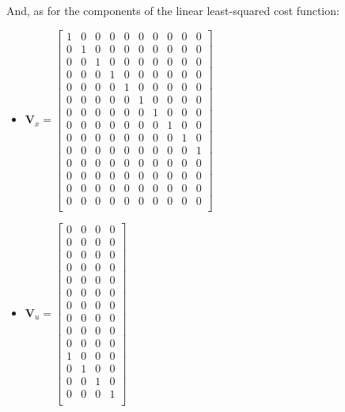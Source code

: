 \documentclass{thesisreport}
\begin{document}
And, as for the components of the linear least-squared cost function:
\begin{multicols}{2}
\begin{itemize}
	\item $\bm{V}_x = \begin{bmatrix}
	1 & 0 & 0 & 0 & 0 & 0 & 0 & 0 & 0 & 0 \\
	0 & 1 & 0 & 0 & 0 & 0 & 0 & 0 & 0 & 0 \\
	0 & 0 & 1 & 0 & 0 & 0 & 0 & 0 & 0 & 0 \\
	0 & 0 & 0 & 1 & 0 & 0 & 0 & 0 & 0 & 0 \\
	0 & 0 & 0 & 0 & 1 & 0 & 0 & 0 & 0 & 0 \\
	0 & 0 & 0 & 0 & 0 & 1 & 0 & 0 & 0 & 0 \\
	0 & 0 & 0 & 0 & 0 & 0 & 1 & 0 & 0 & 0 \\
	0 & 0 & 0 & 0 & 0 & 0 & 0 & 1 & 0 & 0 \\
	0 & 0 & 0 & 0 & 0 & 0 & 0 & 0 & 1 & 0 \\
	0 & 0 & 0 & 0 & 0 & 0 & 0 & 0 & 0 & 1 \\
	0 & 0 & 0 & 0 & 0 & 0 & 0 & 0 & 0 & 0 \\
	0 & 0 & 0 & 0 & 0 & 0 & 0 & 0 & 0 & 0 \\
	0 & 0 & 0 & 0 & 0 & 0 & 0 & 0 & 0 & 0 \\
	0 & 0 & 0 & 0 & 0 & 0 & 0 & 0 & 0 & 0 \\
	\end{bmatrix}$
	
	
	
	
\end{itemize}
\columnbreak
\begin{itemize}

	\item $\bm{V}_u = \begin{bmatrix}
	0 & 0 & 0 & 0 \\
	0 & 0 & 0 & 0 \\
	0 & 0 & 0 & 0 \\
	0 & 0 & 0 & 0 \\
	0 & 0 & 0 & 0 \\
	0 & 0 & 0 & 0 \\
	0 & 0 & 0 & 0 \\
	0 & 0 & 0 & 0 \\
	0 & 0 & 0 & 0 \\
	0 & 0 & 0 & 0 \\
	1 & 0 & 0 & 0 \\
	0 & 1 & 0 & 0 \\
	0 & 0 & 1 & 0 \\
	0 & 0 & 0 & 1 \\
	\end{bmatrix}$
	
	
\end{itemize}
\end{multicols}
\end{document}
